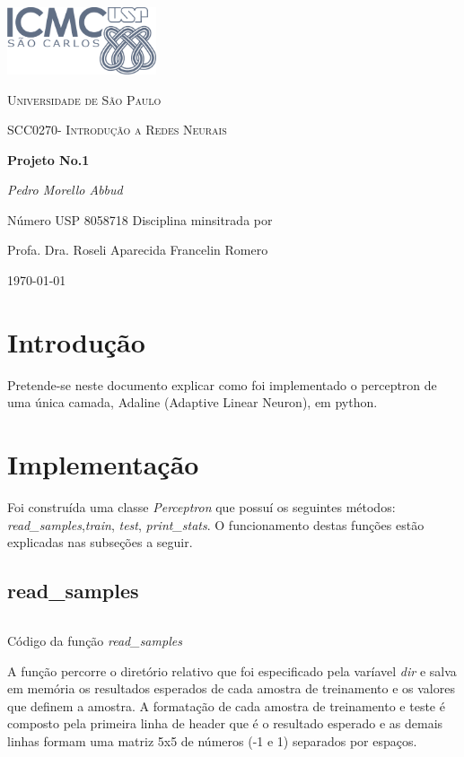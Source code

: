 \documentclass[10pt,a4paper]{article}
\begin{document}
\begin{titlepage}
\centering
\includegraphics[width=0.33\textwidth]{usp.png}\par\vspace{1cm}
{\scshape\LARGE Universidade de São Paulo\par}
  \vspace{1cm}
  {\scshape\Large SCC0270- Introdução a Redes Neurais \par}
  \vspace{1.5cm}
  {\huge\bfseries Projeto No.1\par}
  \vspace{2cm}
  {\Large\itshape Pedro Morello Abbud \par}
  \vspace{1cm}
  Número USP 8058718
  \vfill
  Disciplina minsitrada por\par
  Profa. Dra. Roseli Aparecida Francelin Romero
  

\vfill 
{\large \today\par}
\end{titlepage}
\section{Introdução}
Pretende-se neste documento explicar como foi implementado o perceptron de uma única camada, Adaline (Adaptive Linear Neuron), em python.
\section{Implementação}
Foi construída uma classe \emph{Perceptron} que possuí os seguintes métodos: \emph{read\_samples},\emph{train}, \emph{test}, \emph{print\_stats}. O funcionamento destas funções estão explicadas nas subseções a seguir.
\subsection{read\_samples}
\begin{listing}[H]
  \inputminted[fontsize=\footnotesize,breaklines,bgcolor=bg,linenos,breaklines,firstline=17,lastline=29]{python}{perceptron.py}
\caption{Código da função \emph{read\_samples}}
\label{lst:read}
\end{listing}
A função percorre o diretório relativo que foi especificado pela varíavel \emph{dir} e salva em memória os resultados esperados de cada amostra de treinamento e os valores que definem a amostra. A formatação de cada amostra de treinamento e teste é composto pela primeira linha de header que é o resultado esperado e as demais linhas formam uma matriz 5x5 de números (-1 e 1) separados por espaços.
\end{document}
